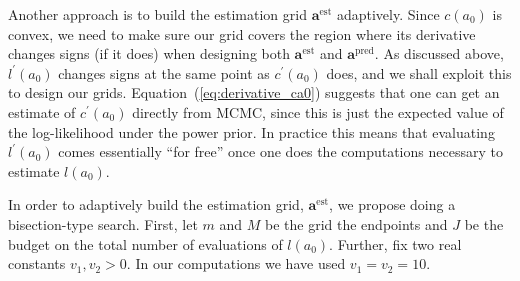 \documentclass[a4paper, notitlepage, 11pt]{article}
\begin{document}
Another approach is to build the estimation grid $\boldsymbol a^{\text{est}}$ adaptively.
Since $c(a_0)$ is convex, we need to make sure our grid covers the region where its derivative changes signs (if it does) when designing both $\boldsymbol a^{\text{est}}$ and $\boldsymbol a^{\text{pred}}$.
As discussed above, $l^\prime(a_0)$ changes signs at the same point as $c^\prime(a_0)$ does, and we shall exploit this to design our grids.
Equation~(\ref{eq:derivative_ca0}) suggests that one can get an estimate of $c^\prime(a_0)$ directly from MCMC, since this is just the expected value of the log-likelihood under the power prior.
In practice this means that evaluating $l^\prime(a_0)$ comes essentially ``for free'' once one does the computations necessary to estimate $l(a_0)$.

In order to adaptively build the estimation grid, $\boldsymbol a^{\text{est}}$, we propose doing a bisection-type search.
First, let $m$ and $M$ be the grid the endpoints and $J$ be the budget on the total number of evaluations of $l(a_0)$.
Further, fix two real constants $v_1, v_2 > 0$.
In our computations we have used $v_1 = v_2 =  10$. 
\end{document}

